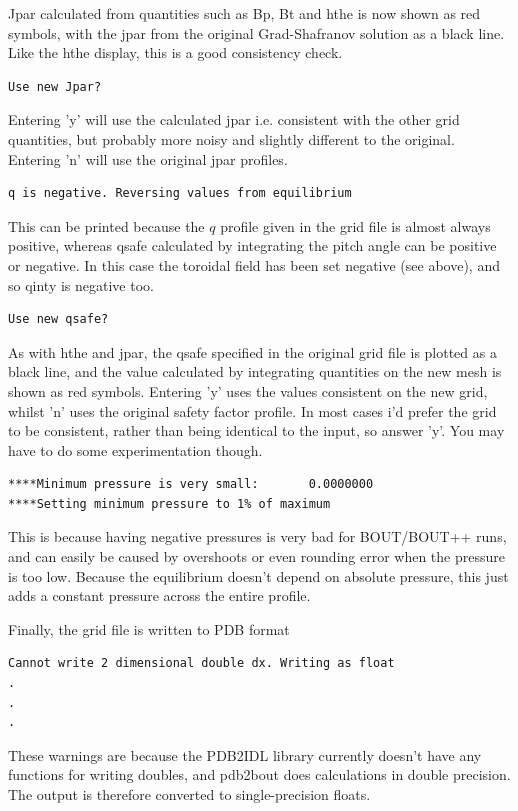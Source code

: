 \documentclass[12pt]{article}
\begin{document}
Jpar calculated from quantities such as Bp, Bt and hthe is now shown as red
symbols, with the jpar from the original Grad-Shafranov solution as a black
line. Like the hthe display, this is a good consistency check.
%
\begin{verbatim}
Use new Jpar?
\end{verbatim}
%
Entering 'y' will use the calculated jpar i.e. consistent with the other grid
quantities, but probably more noisy and slightly different to the original.
Entering 'n' will use the original jpar profiles.

%
\begin{verbatim}
q is negative. Reversing values from equilibrium
\end{verbatim}
%
This can be printed because the $q$ profile given in the grid file is almost
always positive, whereas qsafe calculated by integrating the pitch angle can be
positive or negative. In this case the toroidal field has been set negative
(see above), and so qinty is negative too.

%
\begin{verbatim}
Use new qsafe?
\end{verbatim}
%
As with hthe and jpar, the qsafe specified in the original grid file is plotted
as a black line, and the value calculated by integrating quantities on the new
mesh is shown as red symbols. Entering 'y' uses the values consistent on the
new grid, whilst 'n' uses the original safety factor profile. In most cases i'd
prefer the grid to be consistent, rather than being identical to the input, so
answer 'y'. You may have to do some experimentation though.

%
\begin{verbatim}
****Minimum pressure is very small:       0.0000000
****Setting minimum pressure to 1% of maximum
\end{verbatim}
%
This is because having negative pressures is very bad for BOUT/BOUT++ runs, and
can easily be caused by overshoots or even rounding error when the pressure is
too low. Because the equilibrium doesn't depend on absolute pressure, this just
adds a constant pressure across the entire profile.

Finally, the grid file is written to PDB format
%
\begin{verbatim}
Cannot write 2 dimensional double dx. Writing as float
.
.
.
\end{verbatim}
%
These warnings are because the PDB2IDL library currently doesn't have any
functions for writing doubles, and pdb2bout does calculations in double
precision. The output is therefore converted to single-precision floats.
\end{document}
